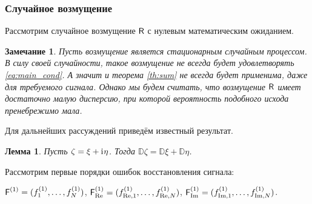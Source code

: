 \documentclass[specialist,
               substylefile = spbu.rtx,
               subf,href,colorlinks=true, 12pt]{disser}
\newtheorem*{notice*}{Замечание}
\newtheorem{remark}{Замечание}
\newtheorem{lemma}{Лемма}
\DeclareMathOperator{\rk}{rk}
\begin{document}


\subsubsection{Случайное возмущение}

Рассмотрим случайное возмущение $\textsf{R}$ с нулевым математическим ожиданием.
\begin{remark} \label{rm:probl_rand}
	Пусть возмущение является стационарным случайным процессом. В силу своей случайности, такое возмущение не всегда будет удовлетворять \eqref{eq:main_cond}. А значит и теорема \ref{th:sum} не всегда будет применима, даже для требуемого сигнала. Однако мы будем считать, что возмущение $\textsf{R}$ имеет достаточно малую дисперсию, при которой вероятность подобного исхода пренебрежимо мала.
\end{remark}

Для дальнейших рассуждений приведём известный результат.
\begin{lemma} \label{std:disp}
	Пусть $\zeta = \xi + \mathrm{i}\mkern1mu\eta$. Тогда $\mathbb{D}\zeta = \mathbb{D}\xi + \mathbb{D}\eta$.
\end{lemma}

Рассмотрим первые порядки ошибок восстановления сигнала:

$\textsf{F}^{(1)} = (f^{(1)}_1, \ldots, f^{(1)}_N)$, $\textsf{F}^{(1)}_{\Re} = (f^{(1)}_{\Re,1}, \ldots, f^{(1)}_{\Re, N})$, $\textsf{F}^{(1)}_{\Im} = (f^{(1)}_{\Im,1}, \ldots, f^{(1)}_{\Im, N})$.
\end{document}
